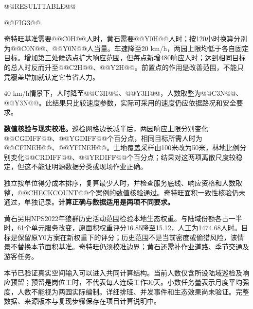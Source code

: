 \documentclass[UTF8,fontset=fandol,12pt,a4paper]{ctexart}
\begin{document}
@@RESULTTABLE@@

@@FIG3@@

奇特旺基准需要@@C0H@@人时，黄石需要@@Y0H@@人时；按120小时换算分别为@@C0N@@、@@Y0N@@人当量。车速降至20 km/h，两园上限均低于各自固定目标。增加第三处候选点扩大响应范围，但每点新增480响应人时；达到相同目标的总人时反而升至@@C2H@@、@@Y2H@@。前置点的作用是改善范围，不能只凭覆盖增加就认定它节省人力。

40 km/h情景下，人时降至@@C3H@@、@@Y3H@@，人数取整为@@C3N@@、@@Y3N@@。此结果只比较速度参数，实际可采用的速度仍应依据路况和安全要求。

\clearpage
\textbf{数值核验与现实校准。}巡检网格边长减半后，两园响应上限分别变化@@CGDIFF@@、@@YGDIFF@@个百分点，相同目标所需人时为@@CFINEH@@、@@YFINEH@@。土地覆盖采样由100米改为50米，林地比例分别变化@@CRDIFF@@、@@YRDIFF@@个百分点；结果对这两项离散尺度较稳定，但这不能证明源数据分类或现场作业正确。

独立按单位得分成本排序，复算最少人时，并检查服务底线、响应资格和人数取整，@@CHECKCOUNT@@个案例的数值核验通过。奇特旺面积一致性核验仍未通过，单独记录。\textbf{计算正确与数据适用是两项不同要求。}

黄石另用NPS2022年狼群历史活动范围检验本地生态权重\cite{wolf}。与陆域份额各占一半时，61个单元服务改变，原面积权重评分16.85降至15.12，人工为1474.68人时。目标是保留原Y0方案在新权重下的评分；历史范围不是当前密度或偷猎风险，该情景不替换本节面积基准。奇特旺仍须校准边界；黄石还需补作业道路、季节交通及游客任务。

本节已验证真实空间输入可以进入共同计算结构。当前人数仅含所设陆域巡检及响应预留；预留是岗位工时，不代表每人连续工作30天。小数任务量表示月度平均强度，人数不能视为两园实际编制。详细排班、并发事件和生态效果尚未验证。完整数据、来源版本与复现步骤保存在项目计算说明中。
\end{document}
